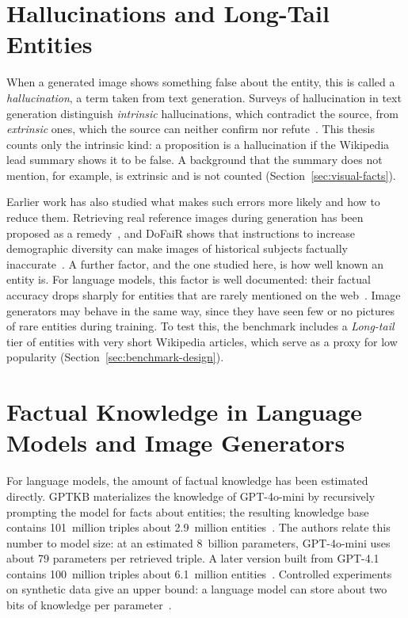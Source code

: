 \section{Hallucinations and Long-Tail Entities}
\label{sec:hallucinations}

When a generated image shows something false about the entity, this is called
a \emph{hallucination}, a term taken from text generation. Surveys of
hallucination in text generation distinguish \emph{intrinsic} hallucinations,
which contradict the source, from \emph{extrinsic} ones, which the source can
neither confirm nor refute~\citep{hallucinationNLG2023,hallucinationSurvey}.
This thesis counts only the intrinsic kind: a proposition is a hallucination if
the Wikipedia lead summary shows it to be false. A background that the summary
does not mention, for example, is extrinsic and is not counted
(Section~\ref{sec:visual-facts}).

Earlier work has also studied what makes such errors more likely and how to
reduce them. Retrieving real reference images during generation has been
proposed as a remedy~\citep{preventimagehallucination2024}, and DoFaiR shows
that instructions to increase demographic diversity can make images of
historical subjects factually inaccurate~\citep{dofair2024}. A further factor,
and the one studied here, is how well known an entity is. For language models,
this factor is well documented: their factual accuracy drops sharply for
entities that are rarely mentioned on the web~\citep{mallen2023,kandpal2023}.
Image generators may behave in the same way, since they have seen few or no
pictures of rare entities during training. To test this, the benchmark
includes a \emph{Long-tail} tier of entities with very short Wikipedia
articles, which serve as a proxy for low popularity
(Section~\ref{sec:benchmark-design}).


\section{Factual Knowledge in Language Models and Image Generators}
\label{sec:llm-vs-t2i}

For language models, the amount of factual knowledge has been estimated
directly.
GPTKB materializes the knowledge of GPT-4o-mini by recursively prompting the
model for facts about entities; the resulting knowledge base contains
101~million triples about 2.9~million entities~\citep{gptkb2025}. The authors
relate this number to model size: at an estimated 8~billion parameters,
GPT-4o-mini uses about 79 parameters per retrieved triple. A later version built
from GPT-4.1 contains 100~million triples about 6.1~million
entities~\citep{gptkb15}. Controlled experiments on synthetic data give an upper
bound: a language model can store about two bits of knowledge per
parameter~\citep{allenzhu2025}.

